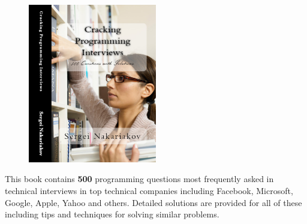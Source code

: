 \begin{figure}
  \begin{center}
    \includegraphics[width=0.5\textwidth]{cracking/cover}
  \end{center}
\end{figure}

This book contains \textbf{500} programming questions most frequently asked in technical interviews in top technical companies including Facebook, Microsoft, Google, Apple, Yahoo and others. Detailed solutions are provided for all of these including tips and techniques for solving similar problems.


